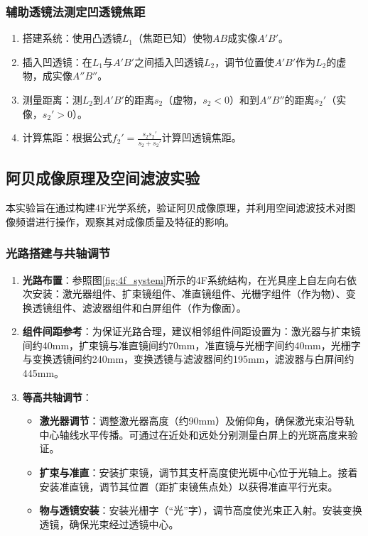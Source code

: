 \documentclass[11pt]{article}
\begin{document}
\subsubsection{辅助透镜法测定凹透镜焦距}
\begin{enumerate}
    \item 搭建系统：使用凸透镜$L_1$（焦距已知）使物$AB$成实像$A'B'$。
    \item 插入凹透镜：在$L_1$与$A'B'$之间插入凹透镜$L_2$，调节位置使$A'B'$作为$L_2$的虚物，成实像$A''B''$。
    \item 测量距离：测$L_2$到$A'B'$的距离$s_2$（虚物，$s_2 < 0$）和到$A''B''$的距离$s_2'$（实像，$s_2' > 0$）。
    \item 计算焦距：根据公式$f_2' = \frac{s_2 s_2'}{s_2 + s_2'}$计算凹透镜焦距。
\end{enumerate}

\subsection{阿贝成像原理及空间滤波实验}

本实验旨在通过构建4F光学系统，验证阿贝成像原理，并利用空间滤波技术对图像频谱进行操作，观察其对成像质量及特征的影响。

\subsubsection{光路搭建与共轴调节}
\begin{enumerate}
    \item \textbf{光路布置}：参照图\ref{fig:4f_system}所示的4F系统结构，在光具座上自左向右依次安装：激光器组件、扩束镜组件、准直镜组件、光栅字组件（作为物）、变换透镜组件、滤波器组件和白屏组件（作为像面）。
    \item \textbf{组件间距参考}：为保证光路合理，建议相邻组件间距设置为：激光器与扩束镜间约40mm，扩束镜与准直镜间约70mm，准直镜与光栅字间约40mm，光栅字与变换透镜间约240mm，变换透镜与滤波器间约195mm，滤波器与白屏间约445mm。
    \item \textbf{等高共轴调节}：
    \begin{itemize}
        \item \textbf{激光器调节}：调整激光器高度（约90mm）及俯仰角，确保激光束沿导轨中心轴线水平传播。可通过在近处和远处分别测量白屏上的光斑高度来验证。
        \item \textbf{扩束与准直}：安装扩束镜，调节其支杆高度使光斑中心位于光轴上。接着安装准直镜，调节其位置（距扩束镜焦点处）以获得准直平行光束。
        \item \textbf{物与透镜安装}：安装光栅字（“光”字），调节高度使光束正入射。安装变换透镜，确保光束经过透镜中心。
    \end{itemize}
\end{enumerate}
\end{document}

